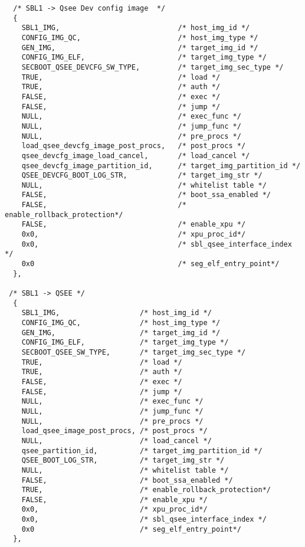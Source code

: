 \begin{lstlisting}
  /* SBL1 -> Qsee Dev config image  */
  {
    SBL1_IMG,                            /* host_img_id */
    CONFIG_IMG_QC,                       /* host_img_type */
    GEN_IMG,                             /* target_img_id */
    CONFIG_IMG_ELF,                      /* target_img_type */
    SECBOOT_QSEE_DEVCFG_SW_TYPE,         /* target_img_sec_type */ 
    TRUE,                                /* load */
    TRUE,                                /* auth */
    FALSE,                               /* exec */
    FALSE,                               /* jump */
    NULL,                                /* exec_func */
    NULL,                                /* jump_func */
    NULL,                                /* pre_procs */ 
    load_qsee_devcfg_image_post_procs,   /* post_procs */
    qsee_devcfg_image_load_cancel,       /* load_cancel */
    qsee_devcfg_image_partition_id,      /* target_img_partition_id */
    QSEE_DEVCFG_BOOT_LOG_STR,            /* target_img_str */
    NULL,                                /* whitelist table */
    FALSE,                               /* boot_ssa_enabled */
    FALSE,                               /* enable_rollback_protection*/
    FALSE,                               /* enable_xpu */
    0x0,                                 /* xpu_proc_id*/    
    0x0,                                 /* sbl_qsee_interface_index */
    0x0                                  /* seg_elf_entry_point*/
  },  
  
 /* SBL1 -> QSEE */
  {
    SBL1_IMG,                   /* host_img_id */
    CONFIG_IMG_QC,              /* host_img_type */
    GEN_IMG,                    /* target_img_id */
    CONFIG_IMG_ELF,             /* target_img_type */
    SECBOOT_QSEE_SW_TYPE,       /* target_img_sec_type */ 
    TRUE,                       /* load */
    TRUE,                       /* auth */
    FALSE,                      /* exec */
    FALSE,                      /* jump */
    NULL,                       /* exec_func */
    NULL,                       /* jump_func */
    NULL,                       /* pre_procs */ 
    load_qsee_image_post_procs, /* post_procs */
    NULL,                       /* load_cancel */
    qsee_partition_id,          /* target_img_partition_id */
    QSEE_BOOT_LOG_STR,          /* target_img_str */
    NULL,                       /* whitelist table */
    FALSE,                      /* boot_ssa_enabled */
    TRUE,                       /* enable_rollback_protection*/
    FALSE,                      /* enable_xpu */
    0x0,                        /* xpu_proc_id*/    
    0x0,                        /* sbl_qsee_interface_index */
    0x0                         /* seg_elf_entry_point*/
  },



\end{lstlisting}
